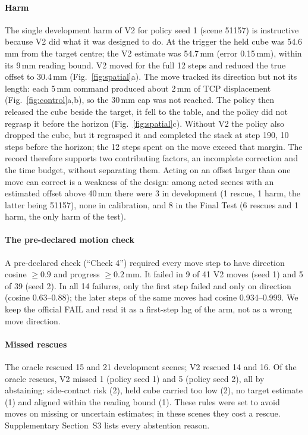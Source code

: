 \paragraph{Harm} The single development harm of V2 for policy seed 1 (scene 51157) is instructive because V2 did what it was designed to do. At the trigger the held cube was 54.6\,mm from the target centre; the V2 estimate was 54.7\,mm (error 0.15\,mm), within its 9\,mm reading bound. V2 moved for the full 12 steps and reduced the true offset to 30.4\,mm (Fig.~\ref{fig:spatial}a). The move tracked its direction but not its length: each 5\,mm command produced about 2\,mm of TCP displacement (Fig.~\ref{fig:control}a,b), so the 30\,mm cap was not reached. The policy then released the cube beside the target, it fell to the table, and the policy did not regrasp it before the horizon (Fig.~\ref{fig:spatial}c). Without V2 the policy also dropped the cube, but it regrasped it and completed the stack at step 190, 10 steps before the horizon; the 12 steps spent on the move exceed that margin. The record therefore supports two contributing factors, an incomplete correction and the time budget, without separating them. Acting on an offset larger than one move can correct is a weakness of the design: among acted scenes with an estimated offset above 40\,mm there were 3 in development (1 rescue, 1 harm, the latter being 51157), none in calibration, and 8 in the Final Test (6 rescues and 1 harm, the only harm of the test).

\paragraph{The pre-declared motion check} A pre-declared check (``Check 4'') required every move step to have direction cosine $\ge0.9$ and progress $\ge0.2$\,mm. It failed in 9 of 41 V2 moves (seed 1) and 5 of 39 (seed 2). In all 14 failures, only the first step failed and only on direction (cosine 0.63--0.88); the later steps of the same moves had cosine 0.934--0.999. We keep the official FAIL and read it as a first-step lag of the arm, not as a wrong move direction.

\paragraph{Missed rescues} The oracle rescued 15 and 21 development scenes; V2 rescued 14 and 16. Of the oracle rescues, V2 missed 1 (policy seed 1) and 5 (policy seed 2), all by abstaining: side-contact risk (2), held cube carried too low (2), no target estimate (1) and aligned within the reading bound (1). These rules were set to avoid moves on missing or uncertain estimates; in these scenes they cost a rescue. Supplementary Section~S3 lists every abstention reason.

